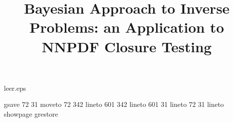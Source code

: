 %
%
%
%
\begin{filecontents}{leer.eps}

gsave
72 31 moveto
72 342 lineto
601 342 lineto
601 31 lineto
72 31 lineto
showpage
grestore
\end{filecontents}
%
\documentclass[epj,nopacs]{svjour}
%

%

%
\title{Bayesian Approach to Inverse Problems: an Application to NNPDF Closure Testing}

